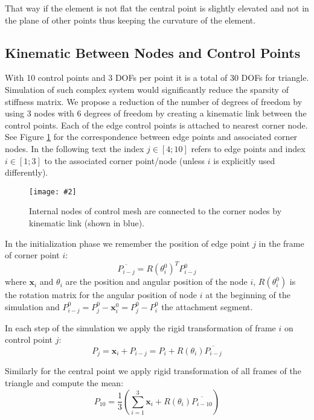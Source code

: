 \documentclass{egpubl}
\newcommand{\Figure}[3]{%
\begin{figure}[htb]
  \centering
  \texttt{[image: \#2]}
  \caption{\label{fig-#2}#3}
\end{figure}}
\begin{document}
That way if the element is not flat the central point is slightly elevated
and not in the plane of other points thus keeping the curvature of the
element.


\subsection{Kinematic Between Nodes and Control Points } %

With 10 control points and 3 DOFs per point it is a total of 30 DOFs for triangle.
Simulation of such complex system would significantly reduce the sparsity of stiffness matrix.
We propose a reduction of the number of degrees of freedom by using 3 nodes with 6 degrees of freedom
by creating a kinematic link between the control points.
Each of the edge control points is attached to nearest corner node. See Figure
\ref{fig-segments2} for the correspondence between edge points and
associated corner nodes. 
In the following text the index $j \in [4;10]$ refers to edge points and index $i \in [1;3]$ to the associated corner point/node (unless $i$ is explicitly used differently).

\Figure{0.6\linewidth}{segments2}
{Internal nodes of control mesh are connected to the corner nodes by kinematic link (shown in blue).}

In the initialization phase we remember the position of edge point $j$ in the frame of corner point $i$:
%
\begin{equation}
    \overline{P_{i-j}} = R(\theta_i^0)^T P_{i-j}^0
\end{equation}
%
where
$\mathbf{x}_i$ and $\theta_i$ are the position and angular position of the node $i$,
$R(\theta_i^0)$ is the rotation matrix for the angular position of node $i$ at the beginning of the simulation and
$P_{i-j}^0 = P_j^0 - \mathbf{x}_i^0 = P_j^0 - P_i^0$ the attachment segment.

In each step of the simulation we
apply the rigid transformation of frame $i$ on control point $j$:
%
\begin{equation}
    P_j = \mathbf{x}_i + P_{i-j} = P_i + R(\theta_i) \overline{P_{i-j}}
\end{equation}

Similarly for the central point we apply rigid transformation of all frames of the triangle and compute the mean:
%
\begin{equation}\label{eq-central2}
    P_{10} =  \frac{1}{3}\left( \sum_{i=1}^3 \mathbf{x}_i + R(\theta_i) \overline{P_{i-10}} \right)
\end{equation}
\end{document}
